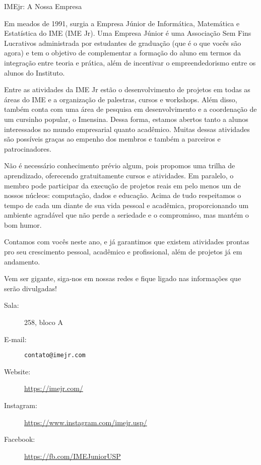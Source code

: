\begin{subsecao}{IMEjr: A Nossa Empresa}


Em meados de 1991, surgia a Empresa Júnior de Informática, Matemática e Estatística 
do IME (IME Jr). Uma Empresa Júnior é uma Associação Sem Fins Lucrativos administrada 
por estudantes de graduação (que é o que vocês são agora) e tem o objetivo de complementar 
a formação do aluno em termos da integração entre teoria e prática, além de incentivar 
o empreendedorismo entre os alunos do Instituto. 

Entre as atividades da IME Jr estão o desenvolvimento de projetos em todas as áreas do IME 
e a organização de palestras, cursos e workshops. Além disso, também conta com uma área de 
pesquisa em desenvolvimento e a coordenação de um cursinho popular, o Imensina. Dessa forma, 
estamos abertos tanto a alunos interessados no mundo empresarial quanto acadêmico. Muitas 
dessas atividades são possíveis graças ao empenho dos membros e também a parceiros e patrocinadores. 

Não é necessário conhecimento prévio algum, pois propomos uma trilha de aprendizado, oferecendo 
gratuitamente cursos e atividades. Em paralelo, o membro pode participar da execução de projetos 
reais em pelo menos um de nossos núcleos: computação, dados e educação. Acima de tudo respeitamos 
o tempo de cada um diante de sua vida pessoal e acadêmica, proporcionando um ambiente agradável que 
não perde a seriedade e o compromisso, mas mantém o bom humor.

Contamos com vocês neste ano, e já garantimos que existem atividades prontas pro seu crescimento pessoal, 
acadêmico e profissional, além de projetos já em andamento.

Vem ser gigante, siga-nos em nossas redes e fique ligado nas informações que serão divulgadas!

\begin{description}
\item [Sala:] 258, bloco A
\item[E-mail:] \texttt{contato@imejr.com}
\item[Website:] \url{https://imejr.com/}
\item[Instagram:] \url{https://www.instagram.com/imejr.usp/}
\item[Facebook:] \url{https://fb.com/IMEJuniorUSP}
\end{description}

\end{subsecao}
